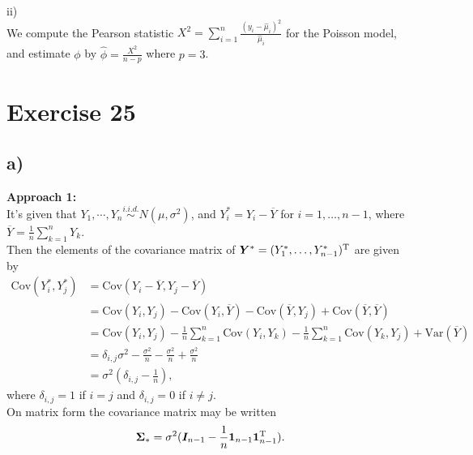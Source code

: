 \documentclass[a4paper]{article}
\newcommand{\Var}{\mathrm{Var}}
\newcommand{\Cov}{\mathrm{Cov}}
\begin{document}
ii)\\
We compute the Pearson statistic $X^{2} = \sum_{i=1}^{n} \frac{(y_{i} - \widehat{\mu}_{i})^{2}}{\widehat{\mu}_{i}}$ for the Poisson model, and estimate $\phi$ by $\widehat{\phi} = \frac{X^{2}}{n-p}$ where $p = 3$.



\vspace{\baselineskip}
\section{Exercise 25}
\subsection{a)}

\textbf{\large Approach 1:}\\
It's given that $Y_{1}, \cdots, Y_{n} \stackrel{i.i.d.}{\sim} N(\mu, \sigma^2)$, and $Y_{i}^{*} = Y_{i} -\overline{Y}$ for
$i=1,\ldots,n-1$,  where $\overline{Y}=\frac{1}{n}\sum_{k=1}^{n} Y_{k}$.\\
Then the elements of the covariance matrix of $\bm{Y}^{*} = (Y_{1}^{*}, \ldots, Y_{n-1}^{*})^{\rm T}$ are given by
%
\begin{align*}
\Cov(Y_{i}^{*},Y_{j}^{*})&=\Cov(Y_{i}-\overline{Y},Y_{j}-\overline{Y})\\
&=\Cov(Y_{i},Y_{j})-\Cov(Y_{i},\overline{Y})-\Cov(\overline{Y},Y_{j})+\Cov(\overline{Y},\overline{Y})\\
&=\Cov(Y_{i},Y_{j})-\frac{1}{n}\sum_{k=1}^{n} \Cov\left(Y_{i}, Y_{k}\right)-\frac{1}{n}\sum_{k=1}^n\Cov\left(Y_{k},Y_{j}\right)
+\Var(\overline{Y})\\
&= \delta_{i,j}\sigma^{2} - \frac{\sigma^2}{n} -\frac{\sigma^2}{n} +\frac{\sigma^2}{n}\\
& = \sigma^2\left(\delta_{i,j} - \frac{1}{n}\right),
\end{align*}
%
where $\delta_{i,j}=1$ if $i=j$ and $\delta_{i,j}=0$ if $i \ne j$.\\[0.3cm]
%
On matrix form the covariance matrix may be written
\[
\bm{\Sigma}_{*}= \sigma^2(\bm{I}_{n-1}- \frac{1}{n}\bm{1}_{n-1}\bm{1}_{n-1}^{\rm T}).
\]
\end{document}
